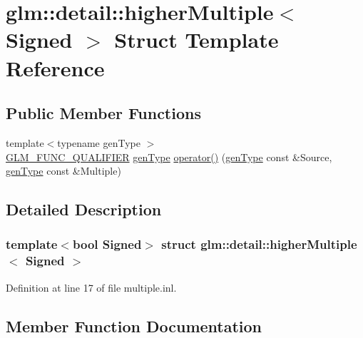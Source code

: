 \hypertarget{structglm_1_1detail_1_1higher_multiple}{}\section{glm\+:\+:detail\+:\+:higher\+Multiple$<$ Signed $>$ Struct Template Reference}
\label{structglm_1_1detail_1_1higher_multiple}
\subsection*{Public Member Functions}
\begin{DoxyCompactItemize}
\item 
{\footnotesize template$<$typename gen\+Type $>$ }\\\hyperlink{setup_8hpp_a33fdea6f91c5f834105f7415e2a64407}{G\+L\+M\+\_\+\+F\+U\+N\+C\+\_\+\+Q\+U\+A\+L\+I\+F\+I\+ER} \hyperlink{structglm_1_1detail_1_1gen_type}{gen\+Type} \hyperlink{structglm_1_1detail_1_1higher_multiple_a6361633200080a366cd84e43b30d70bb}{operator()} (\hyperlink{structglm_1_1detail_1_1gen_type}{gen\+Type} const \&Source, \hyperlink{structglm_1_1detail_1_1gen_type}{gen\+Type} const \&Multiple)
\end{DoxyCompactItemize}


\subsection{Detailed Description}
\subsubsection*{template$<$bool Signed$>$\newline
struct glm\+::detail\+::higher\+Multiple$<$ Signed $>$}



Definition at line 17 of file multiple.\+inl.



\subsection{Member Function Documentation}
\mbox{\label{structglm_1_1detail_1_1higher_multiple_a6361633200080a366cd84e43b30d70bb}} 

